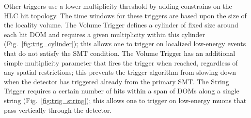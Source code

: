 Other triggers use a lower multiplicity threshold by adding constrains on
the HLC hit topology.  The time windows for these triggers are based upon
the size of the locality volume. The Volume Trigger defines a cylinder of fixed size around
each hit DOM and requires a given multiplicity within this cylinder
(Fig.~\ref{fig:trig_cylinder}); this allows one to trigger on localized
low-energy events that do not satisfy the SMT condition.  The Volume Trigger
has an additional simple multiplicity parameter that fires the trigger when
reached, regardless of any spatial restrictions; this prevents the trigger
algorithm from slowing down when the detector has triggered already from
the primary SMT. The String Trigger requires a certain number of hits
within a span of DOMs along a single string 
(Fig.~\ref{fig:trig_string}); this allows one to trigger on low-energy
muons that pass vertically through the detector.

